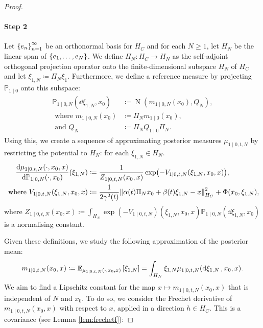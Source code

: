 \begin{proof}
  \paragraph{Step 2} Let \(\qty{e_{n}}_{n=1}^{\infty}\) be an orthonormal basis for \(H_{C}\) and for each \(N \geq 1\), let \(H_{N}\) be the linear span of \(\qty{e_{1}, \ldots, e_{N}}\). We define \(\Pi_{N} : H_{C} \to H_{N}\) as the self-adjoint orthogonal projection operator onto the finite-dimensional subspace \(H_{N}\) of \(H_{C}\) and let \(\xi_{1,N} \coloneqq \Pi_{N} \xi_{1}\). Furthermore, we define a reference measure by projecting \(\mathbb{P}_{1 \mid 0}\) onto this subspace:
  \begin{align*}
    \mathbb{P}_{1 \mid 0, N}(\dd{\xi_{1, N}}, x_{0}) &\coloneqq \operatorname{N}(m_{1 \mid 0, N}(x_{0}),  Q_{N}), \\
    \text{ where } m_{1 \mid 0, N}(x_{0}) &\coloneqq \Pi_{N} m_{1 \mid 0}(x_{0}), \\
    \text{ and } Q_{N} &\coloneqq \Pi_{N} Q_{1 \mid 0} \Pi _{N}.
  \end{align*}
  Using this, we create a sequence of approximating posterior measures \(\mu_{1 \mid 0, t, N}\) by restricting the potential to \(H_{N}\): for each \(\xi_{1,N} \in H_{N}\).
  \begin{align*}
    \dv{\mu_{1 \mid 0, t, N}(\cdot, x_{0}, x)}{\mathbb{P}_{1 \mid 0, N}(\cdot, x_{0})}{}(\xi_{1,N}) &\coloneqq \frac{1}{Z_{1 \mid 0, t, N}(x_{0}, x)} \exp(-V_{1 \mid 0, t, N}(\xi_{1,N}, x_{0}, x)), \\
    \text{ where } V_{1 \mid 0, t, N}(\xi_{1, N}, x_{0}, x) &\coloneqq  \frac{1}{2\gamma^{2}(t)} \norm{\alpha(t) \Pi_{N} x_{0} + \beta(t) \xi_{1, N} - x}^{2}_{H_{C}} + \Phi(x_{0}, \xi_{1, N}),
  \end{align*}
  where \(Z_{1 \mid 0, t, N}(x_{0}, x) \coloneqq \int_{H_{N}} \exp(-V_{1 \mid 0, t, N})(\xi_{1, N}, x_{0}, x) \mathbb{P}_{1 \mid 0, N}(\dd{\xi_{1, N}, x_{0}})\) is a normalising constant.

  Given these definitions, we study the following approximation of the posterior mean:
  \begin{equation}
    m_{1 \mid 0, t, N}(x_{0}, x) \coloneqq \mathop{\mathbb{E}_{\mu_{1 \mid 0, t, N}(\cdot, x_{0}, x)}}\qty[\xi_{1, N}] = \int_{H_{N}} \xi_{1, N}\mu_{1 \mid 0, t, N}(\dd{\xi_{1, N}}, x_{0}, x).\label{eqn:apm}
  \end{equation}
  We aim to find a Lipschitz constant for the map \(x \mapsto m_{1 \mid 0, t, N}(x_{0}, x)\) that is independent of \(N\) and \(x_{0}\). To do so, we consider the Frechet derivative of \(m_{1 \mid 0, t, N}(x_{0}, x)\) with respect to \(x\), applied in a direction \(h \in H_{C}\). This is a covariance (see Lemma \ref{lem:frechetf}):


\end{proof}
